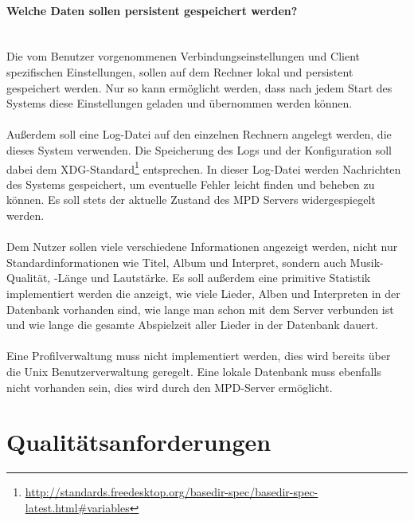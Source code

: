\paragraph{Welche Daten sollen persistent gespeichert werden?}\ \\ 
Die vom Benutzer vorgenommenen Verbindungseinstellungen und Client spezifischen Einstellungen,
sollen auf dem Rechner lokal und persistent gespeichert werden. Nur so kann ermöglicht werden,
dass nach jedem Start des Systems diese Einstellungen geladen und übernommen werden können. 
\\ \\
Außerdem soll eine Log-Datei auf den einzelnen Rechnern angelegt werden, die dieses System
verwenden. Die Speicherung des Logs und der Konfiguration soll dabei dem XDG-Standard\footnote{\url{http://standards.freedesktop.org/basedir-spec/basedir-spec-latest.html\#variables}} entsprechen. 
In dieser Log-Datei werden Nachrichten des Systems gespeichert, um eventuelle Fehler
leicht finden und beheben zu können. Es soll stets der aktuelle Zustand des MPD Servers widergespiegelt werden.
\\ \\
Dem Nutzer sollen viele verschiedene Informationen angezeigt werden, nicht nur Standardinformationen
wie Titel, Album und Interpret, sondern auch Musik-Qualität, -Länge und Lautstärke.
Es soll außerdem eine primitive Statistik implementiert werden die anzeigt, wie viele Lieder, Alben und
Interpreten in der Datenbank vorhanden sind, wie lange man schon mit dem Server verbunden ist und wie 
lange die gesamte Abspielzeit aller Lieder in der Datenbank dauert.\ 
\\ \\
Eine Profilverwaltung muss nicht implementiert werden, dies wird bereits über die Unix Benutzerverwaltung geregelt.
Eine lokale Datenbank muss ebenfalls nicht vorhanden sein, dies wird durch den MPD-Server ermöglicht.

\section{Qualitätsanforderungen}
